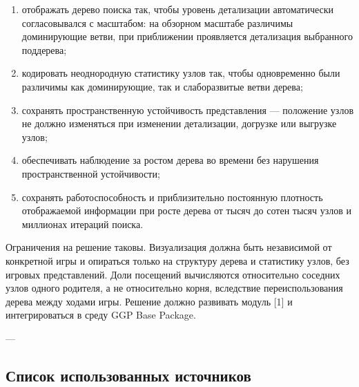 \begin{enumerate}

  \item отображать дерево поиска так, чтобы уровень детализации автоматически согласовывался с масштабом: на обзорном масштабе различимы доминирующие ветви, при приближении проявляется детализация выбранного поддерева;

  \item кодировать неоднородную статистику узлов так, чтобы одновременно были различимы как доминирующие, так и слаборазвитые ветви дерева;

  \item сохранять пространственную устойчивость представления — положение узлов не должно изменяться при изменении детализации, догрузке или выгрузке узлов;

  \item обеспечивать наблюдение за ростом дерева во времени без нарушения пространственной устойчивости;

  \item сохранять работоспособность и приблизительно постоянную плотность отображаемой информации при росте дерева от тысяч до сотен тысяч узлов и миллионах итераций поиска.

\end{enumerate}

Ограничения на решение таковы. Визуализация должна быть независимой от конкретной игры и опираться только на структуру дерева и статистику узлов, без игровых представлений. Доли посещений вычисляются относительно соседних узлов одного родителя, а не относительно корня, вследствие переиспользования дерева между ходами игры. Решение должно развивать модуль [1] и интегрироваться в среду GGP Base Package.

---

\subsection*{Список использованных источников}

